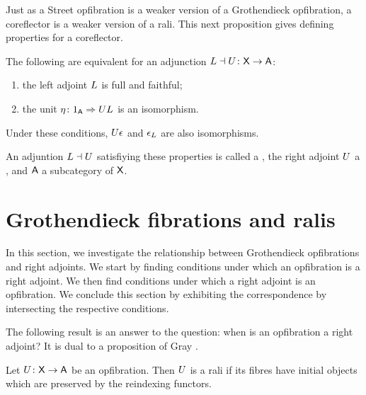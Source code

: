 \documentclass{amsart}
\begin{document}
Just as a Street opfibration is a weaker version of a Grothendieck
opfibration, a coreflector is a weaker version of a rali.  This next
proposition gives defining properties for a coreflector.

\begin{prop}\label{prop:coreflection}
  The following are equivalent for an adjunction
  $L\dashv U\colon\mathsf{X}\to\mathsf{A}$:
  \begin{enumerate}
  \item the left adjoint $L$ is full and faithful;
  \item the unit $\eta\colon1_{\mathsf{A}}\Rightarrow UL$ is an isomorphism.
 \end{enumerate}
 Under these conditions, $U\epsilon$ and $\epsilon_L$ are also
 isomorphisms.
\end{prop}

An adjuntion $L\dashv U$ satisfiying these properties is called a
, the right adjoint $U$ a , and
$\mathsf{A}$ a  subcategory of $\mathsf{X}$.



\section{Grothendieck fibrations and ralis}
\label{sec:groth-fibs-ralis}

In this section, we investigate the relationship between Grothendieck opfibrations and right adjoints. We start by finding conditions under which an opfibration is a right adjoint.  We then find conditions under which a right adjoint is an opfibration. We conclude this section by exhibiting the correspondence by intersecting the respective conditions.

The following result is an answer to the question: when is an opfibration a right adjoint? It is dual to a proposition of Gray \cite[Prop. 4.4]{Grayfibredandcofibred}.

\begin{prop} \label{prop:opfibtolari} Let $U \colon \mathsf{X} \to \mathsf{A}$ be an  opfibration. Then $U$ is a rali if its fibres have initial objects which are preserved by the reindexing functors.
\end{prop}
\end{document}
